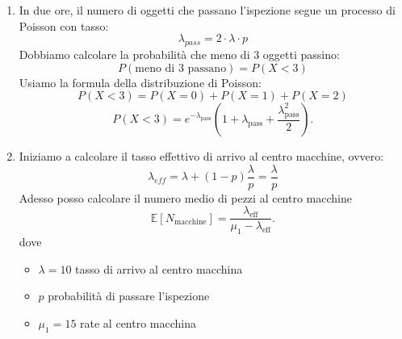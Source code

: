 \documentclass[a4paper,12pt]{article}
\begin{document}
\begin{itemize}
\begin{enumerate} [label=\alph*)]
\[			\]
			\item In due ore, il numero di oggetti che passano l'ispezione segue un processo di Poisson con tasso:\\
			\[\lambda_{pass}=2 \cdot \lambda \cdot p
			\]
			Dobbiamo calcolare la probabilità che meno di 3 oggetti passino:\\
			\[
			P(\text{meno di 3 passano})=P(X<3)
			\]
			Usiamo la formula della distribuzione di Poisson:
			\[
			P(X < 3) = P(X = 0) + P(X = 1) + P(X = 2)
			\]
			\[
			P(X < 3) = e^{-\lambda_{\text{pass}}} \left( 1 + \lambda_{\text{pass}} + \frac{\lambda_{\text{pass}}^2}{2} \right).
			\]
			
			\item Iniziamo a calcolare il tasso effettivo di arrivo al centro macchine, ovvero:\\
			\[\lambda_{eff}=\lambda +(1-p)\frac{\lambda}{p}=\frac{\lambda}{p}
			\]
			Adesso posso calcolare il numero medio di pezzi al centro macchine\\
			\[
			\mathbb{E}[N_{\text{macchine}}] = \frac{\lambda_{\text{eff}}}{\mu_1 - \lambda_{\text{eff}}}.
			\]
			dove\\
			\begin{itemize}
				\item $\lambda = 10$ tasso di arrivo al centro macchina
				\item $p$ probabilità di passare l'ispezione 
				\item $\mu_1 = 15$ rate al centro macchina
			\end{itemize}
			

\end{enumerate}
\end{itemize}
\end{document}
